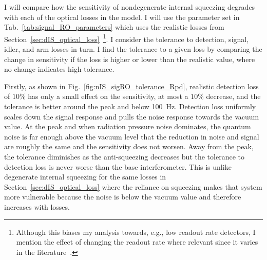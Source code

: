 I will compare how the sensitivity of nondegenerate internal squeezing degrades with each of the optical losses in the model. I will use the parameter set in Tab.~\ref{tab:signal_RO_parameters} which uses the realistic losses from Section~\ref{sec:dIS_optical_loss}~\footnote{Although this biases my analysis towards, e.g., low readout rate detectors, I mention the effect of changing the readout rate where relevant since it varies in the literature~\cite{}. }.
I consider the tolerance to detection, signal, idler, and arm losses in turn. I find the tolerance to a given loss by comparing the change in sensitivity if the loss is higher or lower than the realistic value, where no change indicates high tolerance. 

Firstly, as shown in Fig.~\ref{fig:nIS_sigRO_tolerance_Rpd}, realistic detection loss of $10\%$ has only a small effect on the sensitivity, at most a $10\%$ decrease, and the tolerance is better around the peak and below 100~Hz.
Detection loss uniformly scales down the signal response and pulls the noise response towards the vacuum value. At the peak and when radiation pressure noise dominates, the quantum noise is far enough above the vacuum level that the reduction in noise and signal are roughly the same and the sensitivity does not worsen. Away from the peak, the tolerance diminishes as the anti-squeezing decreases but the tolerance to detection loss is never worse than the base interferometer. This is unlike degenerate internal squeezing for the same losses in Section~\ref{sec:dIS_optical_loss} where the reliance on squeezing makes that system more vulnerable because the noise is below the vacuum value and therefore increases with losses. %


